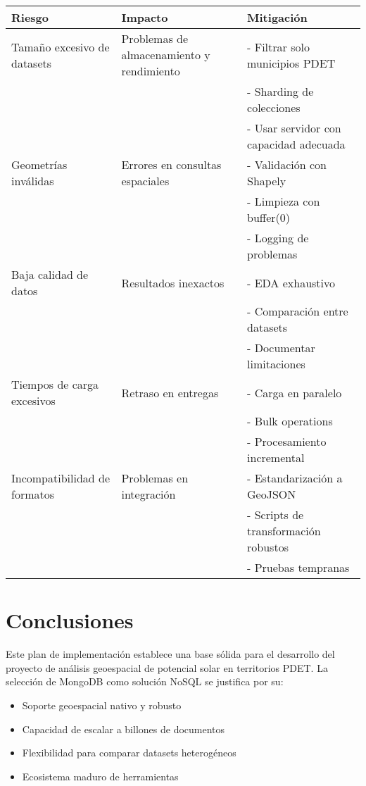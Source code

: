 \documentclass[12pt,a4paper]{article}
\begin{document}
\begin{longtable}{@{}p{}p{}p{}@{}}
\toprule
\textbf{Riesgo} & \textbf{Impacto} & \textbf{Mitigación} \\ \midrule
\endhead

Tamaño excesivo de datasets & Problemas de almacenamiento y rendimiento & 
- Filtrar solo municipios PDET \\
& & - Sharding de colecciones \\
& & - Usar servidor con capacidad adecuada \\ \midrule

Geometrías inválidas & Errores en consultas espaciales & 
- Validación con Shapely \\
& & - Limpieza con buffer(0) \\
& & - Logging de problemas \\ \midrule

Baja calidad de datos & Resultados inexactos & 
- EDA exhaustivo \\
& & - Comparación entre datasets \\
& & - Documentar limitaciones \\ \midrule

Tiempos de carga excesivos & Retraso en entregas & 
- Carga en paralelo \\
& & - Bulk operations \\
& & - Procesamiento incremental \\ \midrule

Incompatibilidad de formatos & Problemas en integración & 
- Estandarización a GeoJSON \\
& & - Scripts de transformación robustos \\
& & - Pruebas tempranas \\ \bottomrule
\end{longtable}

\section{Conclusiones}

Este plan de implementación establece una base sólida para el desarrollo del proyecto de análisis geoespacial de potencial solar en territorios PDET. La selección de MongoDB como solución NoSQL se justifica por su:

\begin{itemize}[leftmargin=*]
    \item Soporte geoespacial nativo y robusto
    \item Capacidad de escalar a billones de documentos
    \item Flexibilidad para comparar datasets heterogéneos
    \item Ecosistema maduro de herramientas
\end{itemize}
\end{document}
